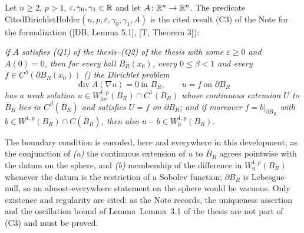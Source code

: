 \begin{definition}
Let $n\ge2$, $p>1$, $\varepsilon,\gamma_0,\gamma_1\in\mathbb{R}$ and let
$A\colon\mathbb{R}^n\to\mathbb{R}^n$.  The predicate
$\mathrm{CitedDirichletHolder}(n,p,\varepsilon,\gamma_0,\gamma_1,A)$ is the cited
result (C3) of the Note for the formalization ([DB, Lemma 5.1], [T, Theorem 3]):

\emph{if $A$ satisfies (Q1) of the thesis--(Q2) of the thesis with some $\varepsilon\ge0$
and $A(0)=0$, then for every ball $B_R(x_0)$, every $0\le\beta<1$ and every
$f\in C^\beta(\partial B_R(x_0))$ () the Dirichlet problem
\[
\operatorname{div}A(\nabla u)=0\ \text{in }B_R,\qquad u=f\ \text{on }\partial B_R
\]
has a weak solution $u\in W^{1,p}_{\mathrm{loc}}(B_R)\cap C^1(B_R)$ whose
continuous extension $U$ to $\overline B_R$ lies in $C^\beta(\overline B_R)$ and
satisfies $U=f$ on $\partial B_R$; and if moreover $f=b|_{\partial B_R}$ with
$b\in W^{1,p}(B_R)\cap C(\overline B_R)$, then also $u-b\in W^{1,p}_0(B_R)$.}

The boundary condition is encoded, here and everywhere in this development, as
the conjunction of \emph{(a)} the continuous extension of $u$ to $\overline B_R$
agrees pointwise with the datum on the sphere, and \emph{(b)} membership of the
difference in $W^{1,p}_0(B_R)$ whenever the datum is the restriction of a
Sobolev function; $\partial B_R$ is Lebesgue-null, so an almost-everywhere
statement on the sphere would be vacuous.  Only existence and regularity are
cited: as the Note records, the uniqueness assertion and the oscillation bound
of Lemma~Lemma~3.1 of the thesis are not part of (C3) and must be proved.
\end{definition}
